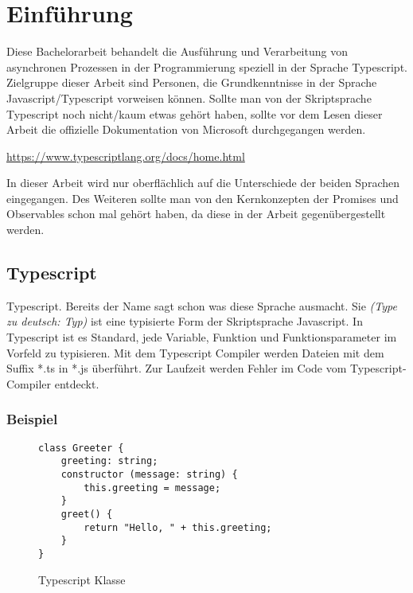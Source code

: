 \setcounter{secnumdepth}{1}
\section{Einführung}
Diese Bachelorarbeit behandelt die Ausführung und Verarbeitung von asynchronen Prozessen in der Programmierung speziell in der Sprache Typescript.\\
Zielgruppe dieser Arbeit sind Personen, die Grundkenntnisse in der Sprache Javascript/Typescript vorweisen können.
Sollte man von der Skriptsprache Typescript noch nicht/kaum etwas gehört haben, sollte vor dem Lesen dieser Arbeit die offizielle Dokumentation von Microsoft durchgegangen werden.

\begin{center}
\url{https://www.typescriptlang.org/docs/home.html} 
\end{center}

In dieser Arbeit wird nur oberflächlich auf die Unterschiede der beiden Sprachen eingegangen. Des Weiteren sollte man von den Kernkonzepten der Promises und Observables schon mal gehört haben, da diese in der Arbeit gegenübergestellt werden.

\subsection{Typescript}
Typescript. Bereits der Name sagt schon was diese Sprache ausmacht. Sie \textit{(\glqq{}Type\grqq{} zu deutsch: Typ)} ist eine typisierte Form der Skriptsprache Javascript. In Typescript ist es Standard, jede Variable, Funktion und Funktionsparameter im Vorfeld zu typisieren. Mit dem Typescript Compiler werden Dateien mit dem Suffix *.ts in *.js überführt. Zur Laufzeit werden Fehler im Code vom Typescript-Compiler entdeckt.

\subsubsection{Beispiel}

\begin{figure}[h!]
\begin{lstlisting}
class Greeter {
    greeting: string;
    constructor (message: string) {
        this.greeting = message;
    }
    greet() {
        return "Hello, " + this.greeting;
    }
}  
\end{lstlisting}
\caption{Typescript Klasse \cite{typescript-example}}
\end{figure}

